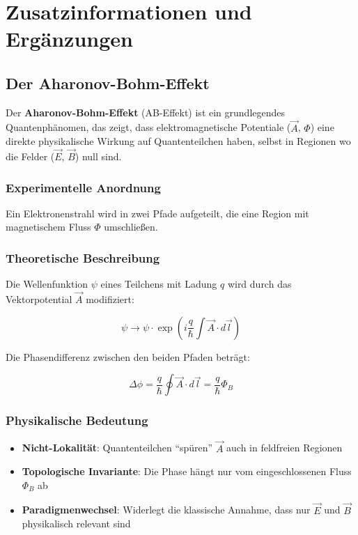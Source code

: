 \chapter{Zusatzinformationen und Ergänzungen}
\section{Der Aharonov-Bohm-Effekt}
\label{sec:aharonov-bohm}

Der \textbf{Aharonov-Bohm-Effekt} (AB-Effekt) ist ein grundlegendes Quantenphänomen, das zeigt, dass elektromagnetische Potentiale ($\vec{A}$, $\Phi$) eine direkte physikalische
Wirkung auf Quantenteilchen haben, selbst in Regionen wo die Felder ($\vec{E}$, $\vec{B}$) null sind.

\subsection{Experimentelle Anordnung}
Ein Elektronenstrahl wird in zwei Pfade aufgeteilt, die eine Region mit magnetischem Fluss $\Phi$ umschließen.

\subsection{Theoretische Beschreibung}
Die Wellenfunktion $\psi$ eines Teilchens mit Ladung $q$ wird durch das Vektorpotential $\vec{A}$ modifiziert:

\begin{equation}
\psi \rightarrow \psi \cdot \exp\left(i\frac{q}{\hbar}\int \vec{A}\cdot d\vec{l}\right)
\end{equation}

Die Phasendifferenz zwischen den beiden Pfaden beträgt:

\begin{equation}
\Delta\phi = \frac{q}{\hbar}\oint \vec{A}\cdot d\vec{l} = \frac{q}{\hbar}\Phi_B
\end{equation}

\subsection{Physikalische Bedeutung}
\begin{itemize}
\item \textbf{Nicht-Lokalität}: Quantenteilchen \enquote{spüren} $\vec{A}$ auch in feldfreien Regionen
\item \textbf{Topologische Invariante}: Die Phase hängt nur vom eingeschlossenen Fluss $\Phi_B$ ab
\item \textbf{Paradigmenwechsel}: Widerlegt die klassische Annahme, dass nur $\vec{E}$ und $\vec{B}$ physikalisch relevant sind
\end{itemize}

